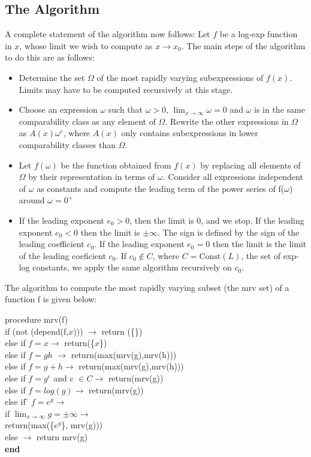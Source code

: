 \subsection{The Algorithm}
A complete statement of the algorithm now follows:
Let $f$ be a log-exp function in $x$, whose limit we wish to compute as $x\rightarrow x_0.$ The main steps of the algorithm to do this are as follows:
\begin{itemize}
\item{Determine the set $\Omega$ of the most rapidly varying subexpressions of $f(x)$. Limits may have to be computed recursively at this stage.}
\item{Choose an expression $\omega$ such that $\omega>0$, $\lim_{x \rightarrow \infty} \omega=0 $ and $\omega$ is in the same comparability class as any element of $\Omega$. Rewrite the other expressions in $\Omega$ as $A(x)\omega^{c}$, where $A(x)$ only contains subexpressions in lower comparability classes than $\Omega$.}
\item{Let $f(\omega)$ be the function obtained from $f(x)$ by replacing all elements of $\Omega $ by their representation in terms of $\omega$. Consider all expressions independent of $\omega$ as constants and compute the leading term of the power series of f($\omega$) around $\omega=0^{+}$ }
\item{If the leading exponent $e_0>0$, then the limit is 0, and we stop. If the leading exponent $e_0<0$ then the limit is $\pm \infty$. The sign is defined by the sign of the leading coefficient $c_0$. If the leading exponent $e_0=0$ then the limit is the limit of the leading coeficient $c_0$. If $c_0\not \in C$, where $C=\text{Const}(L)$, the set of exp-log constants, we apply the same algorithm recursively on $c_0$.}
\end{itemize}
The algorithm to compute the most rapidly varying subset (the mrv set) of a function f is given below:
\begin{tabbing}      
procedure mrv(f) \= \\ %
  if (not (depend(f,$x$)))  $\rightarrow$ return (\{\}) \\
  \> else if $f=x \rightarrow$   return(\{$x$\}) \\
 \> else if $f=gh$  $\rightarrow$   return(max(mrv(g),mrv(h))) \\
  else if $f=g+h\rightarrow$   return(max(mrv(g),mrv(h))) \\
  else if $f=g^{c}$ and c $\in C \rightarrow$   return(mrv(g)) \\
  else if $f=log(g)\rightarrow$   return(mrv(g)) \\
  else if \= $f=e^{g}\rightarrow$  \\
   \>   if $\lim_{x \rightarrow \infty} g=\pm\infty \rightarrow$ \\
   \>        return(max(\{$e^{g}$\}, mrv(g))) \\
    \>  else $\rightarrow $ return mrv(g) \\
\bf{end}
\end{tabbing}

